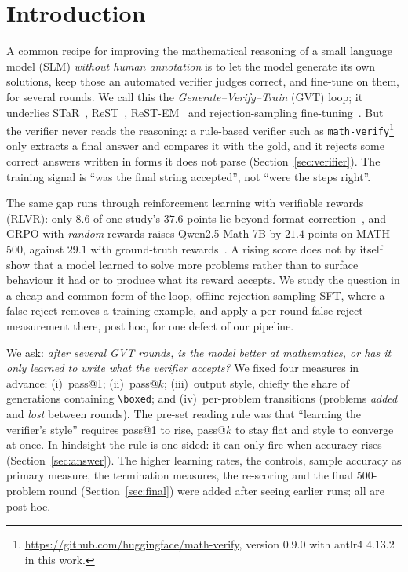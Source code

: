 \documentclass[runningheads]{llncs}
\begin{document}
\section{Introduction}
\label{sec:intro}

A common recipe for improving the mathematical reasoning of a small language
model (SLM) \emph{without human annotation} is to let the model generate its own
solutions, keep those an automated verifier judges correct, and fine-tune on
them, for several rounds. We call this the \emph{Generate--Verify--Train} (GVT)
loop; it underlies STaR~\cite{ref_star}, ReST~\cite{ref_rest},
ReST-EM~\cite{ref_restem} and rejection-sampling fine-tuning~\cite{ref_rft}.
But the verifier never reads the reasoning: a rule-based verifier such as
\texttt{math-verify}\footnote{\url{https://github.com/huggingface/math-verify},
version 0.9.0 with antlr4 4.13.2 in this work.} only extracts a final answer and
compares it with the gold, and it rejects some correct answers written in forms
it does not parse (Section~\ref{sec:verifier}). The training signal is ``was the
final string accepted'', not ``were the steps right''.

The same gap runs through reinforcement learning with verifiable rewards
(RLVR): only $8.6$ of one study's $37.6$ points lie beyond format correction~\cite{ref_oneshot}, and
GRPO with \emph{random} rewards raises Qwen2.5-Math-7B by $21.4$ points on
MATH-500, against $29.1$ with ground-truth rewards~\cite{ref_spurious}. A rising score
does not by itself show that a model learned to solve more problems rather than to
surface behaviour it had or to produce what its reward accepts. We study the question in a cheap and common
form of the loop, offline rejection-sampling SFT, where a false reject
removes a training example, and apply a per-round false-reject
measurement there, post hoc, for one defect of our pipeline.

We ask: \emph{after several GVT rounds, is the model better at mathematics, or
has it only learned to write what the verifier accepts?} We fixed four measures
in advance: (i)~pass@1; (ii)~pass@$k$; (iii)~output style, chiefly the share of
generations containing \verb|\boxed|; and (iv)~per-problem transitions
(problems \emph{added} and \emph{lost} between rounds). The pre-set reading rule
was that ``learning the verifier's style'' requires pass@1 to rise, pass@$k$ to
stay flat and style to converge at once. In hindsight the rule is one-sided: it
can only fire when accuracy rises (Section~\ref{sec:answer}). The higher learning rates, the
controls, sample accuracy as primary
measure, the termination measures, the re-scoring and the final 500-problem round
(Section~\ref{sec:final}) were added after seeing earlier runs; all are post hoc.
\end{document}
